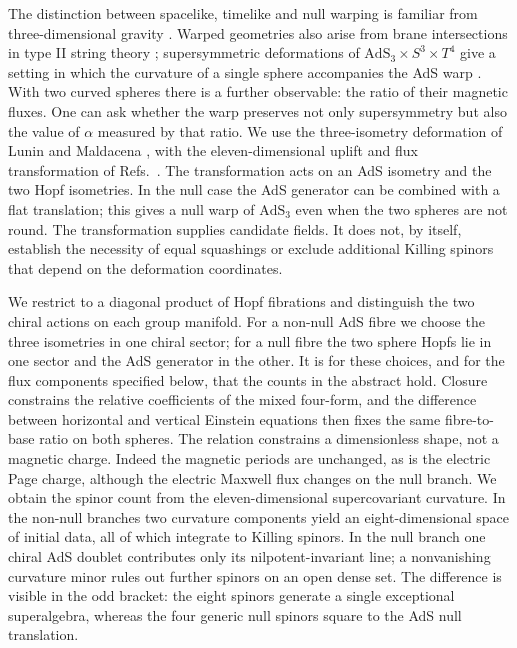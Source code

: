 \documentclass[11pt,a4paper]{article}
\numberwithin{equation}{section}
\newcommand{\AdS}{\mathrm{AdS}}
\begin{document}
The distinction between spacelike, timelike and null warping is familiar from three-dimensional gravity \cite{Anninos}. Warped geometries also arise from brane intersections in type II string theory \cite{Orlando}; supersymmetric deformations of $\AdS_3\times S^3\times T^4$ give a setting in which the curvature of a single sphere accompanies the AdS warp \cite{HST}. With two curved spheres there is a further observable: the ratio of their magnetic fluxes. One can ask whether the warp preserves not only supersymmetry but also the value of $\alpha$ measured by that ratio. We use the three-isometry deformation of Lunin and Maldacena \cite{LM}, with the eleven-dimensional uplift and flux transformation of Refs.~\cite{GLMW,CD}. The transformation acts on an AdS isometry and the two Hopf isometries. In the null case the AdS generator can be combined with a flat translation; this gives a null warp of $\AdS_3$ even when the two spheres are not round. The transformation supplies candidate fields. It does not, by itself, establish the necessity of equal squashings or exclude additional Killing spinors that depend on the deformation coordinates.

We restrict to a diagonal product of Hopf fibrations and distinguish the two chiral actions on each group manifold. For a non-null AdS fibre we choose the three isometries in one chiral sector; for a null fibre the two sphere Hopfs lie in one sector and the AdS generator in the other. It is for these choices, and for the flux components specified below, that the counts in the abstract hold. Closure constrains the relative coefficients of the mixed four-form, and the difference between horizontal and vertical Einstein equations then fixes the same fibre-to-base ratio on both spheres. The relation constrains a dimensionless shape, not a magnetic charge. Indeed the magnetic periods are unchanged, as is the electric Page charge, although the electric Maxwell flux changes on the null branch. We obtain the spinor count from the eleven-dimensional supercovariant curvature. In the non-null branches two curvature components yield an eight-dimensional space of initial data, all of which integrate to Killing spinors. In the null branch one chiral AdS doublet contributes only its nilpotent-invariant line; a nonvanishing curvature minor rules out further spinors on an open dense set. The difference is visible in the odd bracket: the eight spinors generate a single exceptional superalgebra, whereas the four generic null spinors square to the AdS null translation.
\end{document}
